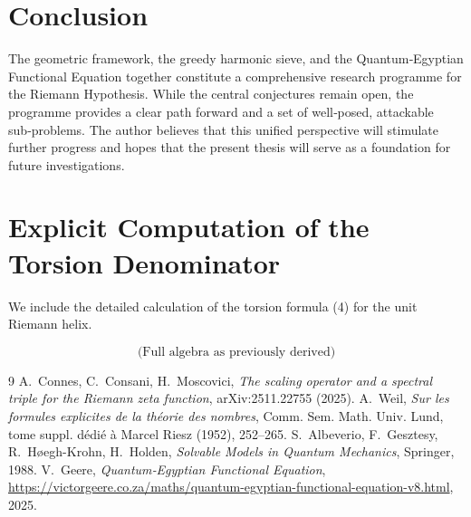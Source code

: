 \documentclass[12pt,a4paper,twoside]{book}
\begin{document}
\chapter*{Conclusion}
The geometric framework, the greedy harmonic sieve, and the Quantum‑Egyptian Functional Equation together constitute a comprehensive research programme for the Riemann Hypothesis.  While the central conjectures remain open, the programme provides a clear path forward and a set of well‑posed, attackable sub‑problems.  The author believes that this unified perspective will stimulate further progress and hopes that the present thesis will serve as a foundation for future investigations.

\appendix
\chapter{Explicit Computation of the Torsion Denominator}
We include the detailed calculation of the torsion formula (4) for the unit Riemann helix.

\[
\text{(Full algebra as previously derived)}
\]


\begin{thebibliography}{9}
A.~Connes, C.~Consani, H.~Moscovici,
\emph{The scaling operator and a spectral triple for the Riemann zeta function},
arXiv:2511.22755 (2025).
A.~Weil,
\emph{Sur les formules explicites de la th\'eorie des nombres},
Comm. Sem. Math. Univ. Lund, tome suppl. d\'edi\'e \`a Marcel Riesz (1952), 252--265.
S.~Albeverio, F.~Gesztesy, R.~H{\o}egh-Krohn, H.~Holden,
\emph{Solvable Models in Quantum Mechanics}, Springer, 1988.
V.~Geere,
\emph{Quantum‑Egyptian Functional Equation},
\url{https://victorgeere.co.za/maths/quantum-egyptian-functional-equation-v8.html}, 2025.
\end{thebibliography}
\end{document}
